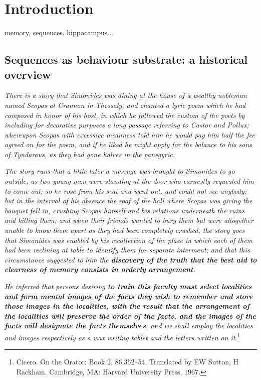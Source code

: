 \chapter{Introduction}

memory, sequences, hippocampus...

\section{Sequences as behaviour substrate: a historical overview}

  \textit{ There is a story that Simonides was dining at the house of a wealthy
    nobleman named Scopas at Crannon in Thessaly, and chanted a lyric poem
    which he had composed in honor of his host, in which he followed the custom
    of the poets by including for decorative purposes a long passage referring
    to Castor and Pollux; whereupon Scopas with excessive meanness told him he
    would pay him half the fee agreed on for the poem, and if he liked he might
    apply for the balance to his sons of Tyndaraus, as they had gone halves in
  the panegyric.  }

  \textit{ The story runs that a little later a message was brought to
    Simonides to go outside, as two young men were standing at the door who
    earnestly requested him to come out; so he rose from his seat and went out,
    and could not see anybody; but in the interval of his absence the roof of
    the hall where Scopas was giving the banquet fell in, crushing Scopas
    himself and his relations underneath the ruins and killing them; and when
    their friends wanted to bury them but were altogether unable to know  them
    apart as they had been completely crushed, the story goes that Simonides
    was enabled by his  recollection of the place in which each of them had
    been reclining at table to identify them for separate interment; and that
    this circumstance suggested to him the \textbf{discovery of the truth that
    the best aid to clearness of memory consists in orderly arrangement}.  }

  \textit{ He inferred that persons desiring \textbf{to train this faculty must
    select localities and form mental images of the facts they wish to
    remember and store those images in the localities, with the result that
    the arrangement of the localities will preserve the order of the facts,
    and the images of the facts will designate the facts themselves}, and we
    shall employ the localities and images respectively as a wax writing tablet
    and the letters written on it.}\footnote{Cicero. On the Orator: Book 2,
    86.352--54. Translated by EW Sutton, H Rackham. Cambridge, MA: Harvard
    University Press, 1967.}

